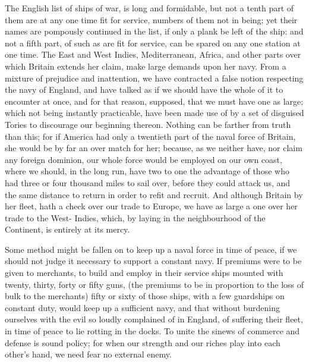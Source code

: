 \documentclass[12pt,oneside]{memoir}
\begin{document}
The English list of ships of war, is long and formidable, but not a
tenth part of them are at any one time fit for service, numbers of
them not in being; yet their names are pompously continued in the
list, if only a plank be left of the ship: and not a fifth part, of
such as are fit for service, can be spared on any one station at one
time. The East and West Indies, Mediterranean, Africa, and other
parts over which Britain extends her claim, make large demands upon
her navy. From a mixture of prejudice and inattention, we have
contracted a false notion respecting the navy of England, and have
talked as if we should have the whole of it to encounter at once,
and for that reason, supposed, that we must have one as large; which
not being instantly practicable, have been made use of by a set of
disguised Tories to discourage our beginning thereon. Nothing can be
farther from truth than this; for if America had only a twentieth
part of the naval force of Britain, she would be by far an over
match for her; because, as we neither have, nor claim any foreign
dominion, our whole force would be employed on our own coast, where
we should, in the long run, have two to one the advantage of those
who had three or four thousand miles to sail over, before they could
attack us, and the same distance to return in order to refit and
recruit. And although Britain by her fleet, hath a check over our
trade to Europe, we have as large a one over her trade to the West-
Indies, which, by laying in the neighbourhood of the Continent, is
entirely at its mercy.

Some method might be fallen on to keep up a naval force in time of
peace, if we should not judge it necessary to support a constant
navy. If premiums were to be given to merchants, to build and employ
in their service ships mounted with twenty, thirty, forty or fifty
guns, (the premiums to be in proportion to the loss of bulk to the
merchants) fifty or sixty of those ships, with a few guardships on
constant duty, would keep up a sufficient navy, and that without
burdening ourselves with the evil so loudly complained of in England,
of suffering their fleet, in time of peace to lie rotting in the
docks. To unite the sinews of commerce and defense is sound policy;
for when our strength and our riches play into each other's hand, we
need fear no external enemy.
\end{document}
